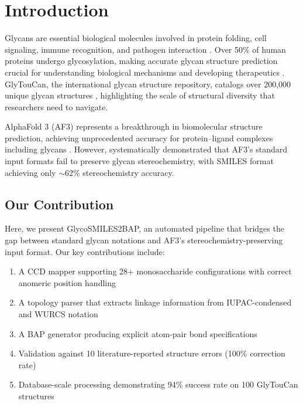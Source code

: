 \section{Introduction}

Glycans are essential biological molecules involved in protein folding, cell signaling, immune recognition, and pathogen interaction \citep{varki2017}. Over 50\% of human proteins undergo glycosylation, making accurate glycan structure prediction crucial for understanding biological mechanisms and developing therapeutics \citep{helenius2004}. GlyTouCan, the international glycan structure repository, catalogs over 200,000 unique glycan structures \citep{tiemeyer2016}, highlighting the scale of structural diversity that researchers need to navigate.

AlphaFold 3 (AF3) represents a breakthrough in biomolecular structure prediction, achieving unprecedented accuracy for protein--ligand complexes including glycans \citep{abramson2024}. However, \citet{huang2025} systematically demonstrated that AF3's standard input formats fail to preserve glycan stereochemistry, with SMILES format achieving only $\sim$62\% stereochemistry accuracy.

\subsection{Our Contribution}

Here, we present GlycoSMILES2BAP, an automated pipeline that bridges the gap between standard glycan notations and AF3's stereochemistry-preserving input format. Our key contributions include:

\begin{enumerate}
\item A CCD mapper supporting 28+ monosaccharide configurations with correct anomeric position handling
\item A topology parser that extracts linkage information from IUPAC-condensed and WURCS notation
\item A BAP generator producing explicit atom-pair bond specifications
\item Validation against 10 literature-reported structure errors (100\% correction rate)
\item Database-scale processing demonstrating 94\% success rate on 100 GlyTouCan structures
\end{enumerate}
